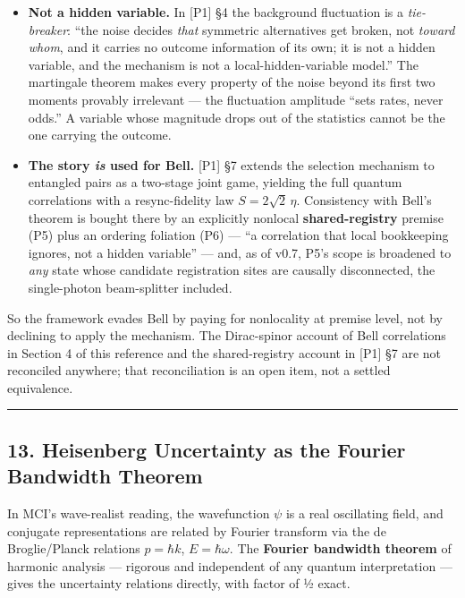\documentclass[
]{article}
\providecommand{\tightlist}{%
  \setlength{\itemsep}{0pt}\setlength{\parskip}{0pt}}
\begin{document}
\begin{itemize}
\tightlist
\item
  \textbf{Not a hidden variable.} In {[}P1{]} §4 the background
  fluctuation is a \emph{tie-breaker}: ``the noise decides \emph{that}
  symmetric alternatives get broken, not \emph{toward whom}, and it
  carries no outcome information of its own; it is not a hidden
  variable, and the mechanism is not a local-hidden-variable model.''
  The martingale theorem makes every property of the noise beyond its
  first two moments provably irrelevant --- the fluctuation amplitude
  ``sets rates, never odds.'' A variable whose magnitude drops out of
  the statistics cannot be the one carrying the outcome.
\item
  \textbf{The story \emph{is} used for Bell.} {[}P1{]} §7 extends the
  selection mechanism to entangled pairs as a two-stage joint game,
  yielding the full quantum correlations with a resync-fidelity law
  \(S = 2\sqrt2\,\eta\). Consistency with Bell's theorem is bought there
  by an explicitly nonlocal \textbf{shared-registry} premise (P5) plus
  an ordering foliation (P6) --- ``a correlation that local bookkeeping
  ignores, not a hidden variable'' --- and, as of v0.7, P5's scope is
  broadened to \emph{any} state whose candidate registration sites are
  causally disconnected, the single-photon beam-splitter included.
\end{itemize}

So the framework evades Bell by paying for nonlocality at premise level,
not by declining to apply the mechanism. The Dirac-spinor account of
Bell correlations in Section 4 of this reference and the shared-registry
account in {[}P1{]} §7 are not reconciled anywhere; that reconciliation
is an open item, not a settled equivalence.

\begin{center}\rule{0.5\linewidth}{0.5pt}\end{center}

\subsection{13. Heisenberg Uncertainty as the Fourier Bandwidth
Theorem}\label{heisenberg-uncertainty-as-the-fourier-bandwidth-theorem}

In MCI's wave-realist reading, the wavefunction \(\psi\) is a real
oscillating field, and conjugate representations are related by Fourier
transform via the de Broglie/Planck relations \(p = \hbar k\),
\(E = \hbar\omega\). The \textbf{Fourier bandwidth theorem} of harmonic
analysis --- rigorous and independent of any quantum interpretation ---
gives the uncertainty relations directly, with factor of ½ exact.
\end{document}
